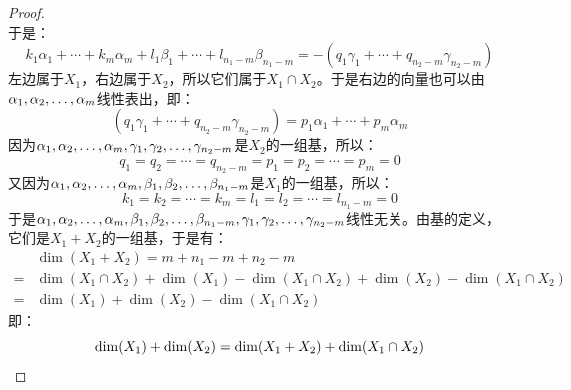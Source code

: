\begin{proof}
\begin{equation*}
	\end{equation*}
	于是：
	\begin{equation*}
		k_1\alpha_1+\cdots+k_m\alpha_m+l_1\beta_1+\cdots+l_{n_1-m}\beta_{n_1-m}=-(q_1\gamma_1+\cdots+q_{n_2-m}\gamma_{n_2-m})
	\end{equation*}
	左边属于$X_1$，右边属于$X_2$，所以它们属于$X_1\cap X_2$。于是右边的向量也可以由$\alpha_1, \alpha_2, \dots, \alpha_{m}$线性表出，即：
	\begin{equation*}
		(q_1\gamma_1+\cdots+q_{n_2-m}\gamma_{n_2-m})=p_1\alpha_1+\cdots+p_m\alpha_m
	\end{equation*}
	因为$\alpha_1, \alpha_2, \dots, \alpha_{m},\gamma_1, \gamma_2, \dots, \gamma_{n_2-m}$是$X_2$的一组基，所以：
	\begin{equation*}
		q_1=q_2=\cdots=q_{n_2-m}=p_1=p_2=\cdots=p_m=0
	\end{equation*}
	又因为$\alpha_1, \alpha_2, \dots, \alpha_{m},\beta_1, \beta_2, \dots, \beta_{n_1-m}$是$X_1$的一组基，所以：
	\begin{equation*}
		k_1=k_2=\cdots=k_m=l_1=l_2=\cdots=l_{n_1-m}=0
	\end{equation*}
	于是$\alpha_1, \alpha_2, \dots, \alpha_{m},\beta_1, \beta_2, \dots, \beta_{n_1-m},\gamma_1, \gamma_2, \dots, \gamma_{n_2-m}$线性无关。由基的定义，它们是$X_1+X_2$的一组基，于是有：
	\begin{align*}
		&\dim(X_1+X_2)
		=m+n_1-m+n_2-m \\
		=&\dim(X_1\cap X_2)+\dim(X_1)-\dim(X_1\cap X_2)+\dim(X_2)-\dim(X_1\cap X_2) \\
		=&\dim(X_1)+\dim(X_2)-\dim(X_1\cap X_2)
	\end{align*}
	即：
	\begin{equation*}
		\dim(X_1)+\dim(X_2)=\dim(X_1+X_2)+\dim(X_1\cap X_2)\qedhere
	\end{equation*}
\end{proof}
